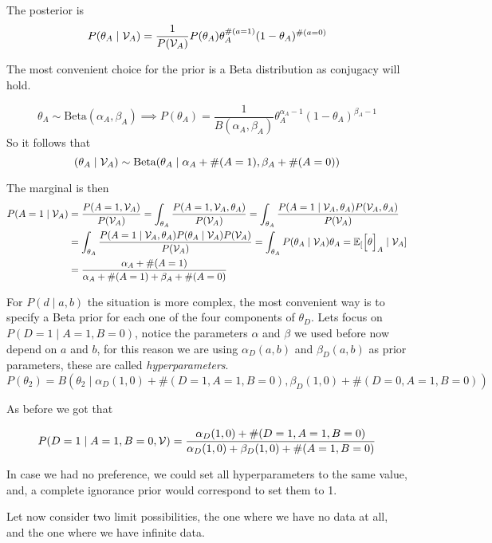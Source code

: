 The posterior is
\[
  P(\theta_{A} \mid \mathcal{V}_{A}) = \frac{1}{P(\mathcal{V}_{A})}P(\theta_{A})\theta_{A}^{\#(a=1)}(1-\theta_{A})^{\#(a=0)}
\]

The most convenient choice for the prior is a Beta distribution as conjugacy
will hold.

\[
  \theta_{A} \sim \text{Beta}(\alpha_{A}, \beta_{A}) \implies P(\theta_{A})  = \frac{1}{B(\alpha_{A}, \beta_{A})}\theta_{A}^{\alpha_{A}-1}(1-\theta_{A})^{\beta_{A} - 1}
\]
So it follows that
\[
  (\theta_{A} \mid \mathcal{V}_{A}) \sim \text{Beta}(\theta_{A} \mid \alpha_{A} + \#(A=1), \beta_{A} + \#(A = 0))
\]

The marginal is then
\[
  \begin{aligned}
    P(A = 1 \mid \mathcal{V}_{A})
    &= \frac{P(A = 1, \mathcal{V}_{A})}{P(\mathcal{V}_{A})} = \int_{\theta_{A}}  \frac{P(A = 1, \mathcal{V}_{A}, \theta_{A})}{P(\mathcal{V}_{A})} =  \int_{\theta_{A}}  \frac{P(A = 1 \mid \mathcal{V}_{A}, \theta_{A}) P(\mathcal{V}_{A}, \theta_{A})}{P(\mathcal{V}_{A})} \\
    &=  \int_{\theta_{A}}  \frac{P(A = 1 \mid \mathcal{V}_{A}, \theta_{A}) P(\theta_{A} \mid \mathcal{V}_{A})P(\mathcal{V}_{A})}{P(\mathcal{V}_{A})} = \int_{\theta_{A}}P(\theta_{A}\mid \mathcal{V}_{A})\theta_{A} = \mathbb{E}_{[}\Big[\theta\Big]_{A} \mid \mathcal{V}_{A}] \\
    &= \frac{\alpha_{A} + \#(A= 1)}{\alpha_{A} + \#(A=1) + \beta_{A} + \#(A=0)}
  \end{aligned}
\]

For \(P(d \mid a ,b)\) the situation is more complex, the most convenient way is
to specify a Beta prior for each one of the four components of \(\theta_{D}\).
Lets focus on \(P(D = 1 \mid A = 1, B = 0)\), notice the parameters \(\alpha\)
and \(\beta\) we used before now depend on \(a\) and \(b\), for this reason we
are using \(\alpha_{D}(a,b)\) and \(\beta_{D}(a,b)\) as prior parameters, these
are called \emph{hyperparameters}.
\[
  P(\theta_{2}) = B(\theta_{2} \mid \alpha_{D}(1,0) + \#(D = 1, A = 1, B = 0), \beta_{D}(1,0) + \#(D = 0, A = 1, B = 0))
\]

As before we got that

\[
  P(D = 1 \mid A = 1, B = 0, \mathcal{V}) = \frac{\alpha_{D}(1,0) + \#(D = 1, A = 1, B = 0)}{\alpha_{D}(1,0) + \beta_{D}(1,0) + \#(A=1, B = 0)}
\]

In case we had no preference, we could set all hyperparameters to the same
value, and, a complete ignorance prior would correspond to set them to 1.

Let now consider two limit possibilities, the one where we have no data at all,
and the one where we have infinite data.

